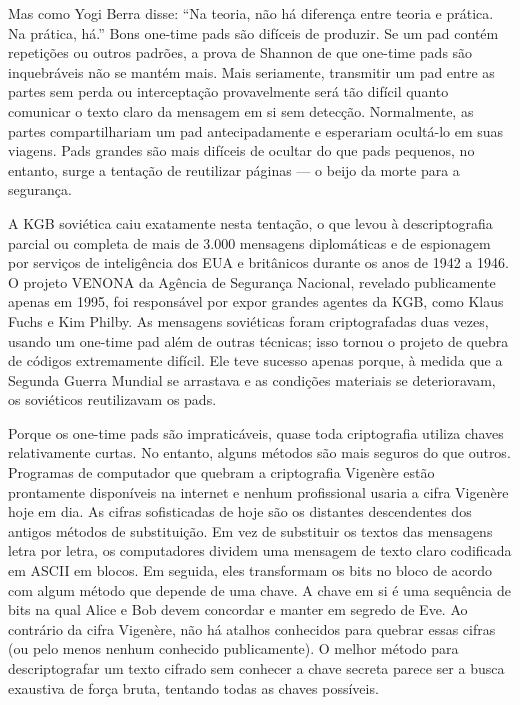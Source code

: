 \documentclass{book}
\begin{document}
Mas como Yogi Berra disse: ``Na teoria, não há diferença entre teoria e prática. Na prática, há.'' Bons one-time pads são difíceis de produzir. Se um pad contém repetições ou outros padrões, a prova de Shannon de que one-time pads são inquebráveis não se mantém mais. Mais seriamente, transmitir um pad entre as partes sem perda ou interceptação provavelmente será tão difícil quanto comunicar o texto claro da mensagem em si sem detecção. Normalmente, as partes compartilhariam um pad antecipadamente e esperariam ocultá-lo em suas viagens. Pads grandes são mais difíceis de ocultar do que pads pequenos, no entanto, surge a tentação de reutilizar páginas --- o beijo da morte para a segurança.

A KGB soviética caiu exatamente nesta tentação, o que levou à descriptografia parcial ou completa de mais de 3.000 mensagens diplomáticas e de espionagem por serviços de inteligência dos EUA e britânicos durante os anos de 1942 a 1946. O projeto VENONA da Agência de Segurança Nacional, revelado publicamente apenas em 1995, foi responsável por expor grandes agentes da KGB, como Klaus Fuchs e Kim Philby. As mensagens soviéticas foram criptografadas duas vezes, usando um one-time pad além de outras técnicas; isso tornou o projeto de quebra de códigos extremamente difícil. Ele teve sucesso apenas porque, à medida que a Segunda Guerra Mundial se arrastava e as condições materiais se deterioravam, os soviéticos reutilizavam os pads.

Porque os one-time pads são impraticáveis, quase toda criptografia utiliza chaves relativamente curtas. No entanto, alguns métodos são mais seguros do que outros. Programas de computador que quebram a criptografia Vigenère estão prontamente disponíveis na internet e nenhum profissional usaria a cifra Vigenère hoje em dia. As cifras sofisticadas de hoje são os distantes descendentes dos antigos métodos de substituição. Em vez de substituir os textos das mensagens letra por letra, os computadores dividem uma mensagem de texto claro codificada em ASCII em blocos. Em seguida, eles transformam os bits no bloco de acordo com algum método que depende de uma chave. A chave em si é uma sequência de bits na qual Alice e Bob devem concordar e manter em segredo de Eve. Ao contrário da cifra Vigenère, não há atalhos conhecidos para quebrar essas cifras (ou pelo menos nenhum conhecido publicamente). O melhor método para descriptografar um texto cifrado sem conhecer a chave secreta parece ser a busca exaustiva de força bruta, tentando todas as chaves possíveis.
\end{document}
